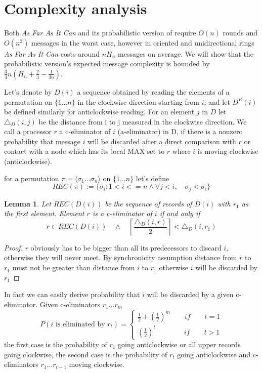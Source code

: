 \documentclass[a4paper,12pt]{article}
\newtheorem{lemma}{Lemma}
\begin{document}
\section{Complexity analysis}
Both \textit{As Far As It Can} and its probabilistic version of require $O(n)$ rounds and $O(n^2)$ messages in the worst case, however in oriented and unidirectional rings \textit{As Far As It Can} costs around $nH_n$ messages on average. We will show that the probabilistic version's expected message complexity is bounded by $\frac{3}{4}n(H_n+\frac{2}{3}-\frac{1}{3n})$.


Let's denote by $D(i)$ a sequence obtained by reading the elements of a permutation on ${\{1\dots n\}}$ in the clockwise direction starting from $i$, and let $D^R(i)$ be defined similarly for anticlockwise reading. For an element $j$ in $D$ let $\triangle_D(i,j)$  be the distance from i to j measured in the clockwise direction. We call a processor $r$ a c-eliminator of $i$ (a-eliminator) in D, if there is a nonzero probability that message $i$ will be discarded after a direct comparison with $r$ or contact with a node which has its local MAX set to $r$ where $i$ is moving clockwise (anticlockwise).

for a permutation $\pi= \langle \sigma_1 \dots \sigma_n \rangle$  on ${\{1\dots n\}}$ let's define \[REC(\pi):=\{\sigma_i : 1<i<=n \land \forall j<i, \quad \sigma_j<\sigma_i\}\]
\begin{lemma}
Let $REC(D(i))$ be the sequence of records of $D(i)$ with $r_1$ as the first element. Element $r$ is a c-eliminator of $i$ if and only if
\[r \in REC(D(i)) \quad \land \quad \left \lceil \frac{\triangle_D(i,r)}{2} \right \rceil < \triangle_D(i,r_1) \]
\end{lemma}
\begin{proof}
$r$ obviously has to be bigger than all its predecessors to discard $i$, otherwise they will never meet. By synchronicity assumption distance from $r$ to $r_1$ must not be greater than distance from $i$ to $r_1$ otherwise $i$ will be discarded by $r_1$
\end{proof}
In fact we can easily derive probability that $i$ will be discarded by a given c-eliminator. Given c-eliminators $r_1 \dots r_m$ 
$$
P(i\text{ is eliminated by }r_t) =
\begin{cases}
\frac{1}{2}+(\frac{1}{2})^m \qquad  if \qquad t=1\\
(\frac{1}{2})^t \qquad \qquad if \qquad t>1
\end{cases}
$$
the first case is the probability of  $r_1$ going anticlockwise or all upper records going clockwise, the second case is the probability of $r_t$ going anticlockwise and c-eliminators $r_1 \dots r_{t-1}$ moving clockwise.
\end{document}
